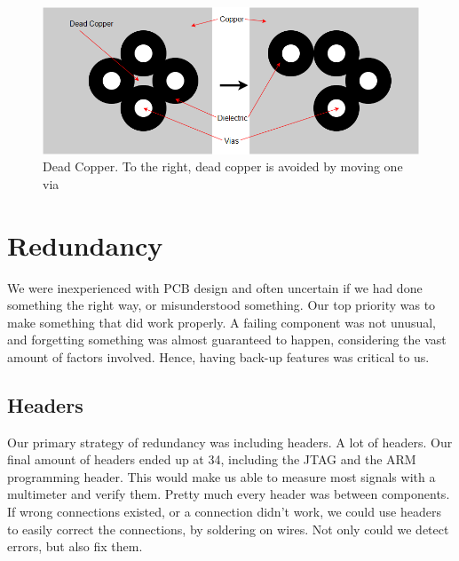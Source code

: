 \begin{figure}[h!]
\centering
\includegraphics[scale = 0.4]{images/Dead_Copper.png}
\caption{Dead Copper. To the right, dead copper is avoided by moving one via}
\label{fig:Dead copper}
\end{figure}

\section{Redundancy}
We were inexperienced with PCB design and often uncertain if we had done something the right way, or misunderstood something. Our top priority was to make something that did work properly. A failing component was not unusual, and forgetting something was almost guaranteed to happen, considering the vast amount of factors involved. Hence, having back-up features was critical to us.
\subsection{Headers}
Our primary strategy of redundancy was including headers. A lot of headers. Our final amount of headers ended up at 34, including the JTAG and the ARM programming header. This would make us able to measure most signals with a multimeter and verify them. 
\newline
Pretty much every header was between components. If wrong connections existed, or a connection didn't work, we could use headers to easily correct the connections, by soldering on wires. Not only could we detect errors, but also fix them.

